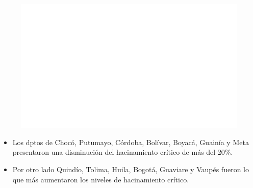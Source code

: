     \begin{figure}[H]
        \caption[Hacinamiento por departamentos - Cambio porcentual entre 2018 y 2020 ]{\label{hacinamiento_dptos_cambio} }
        \begin{center}
        \includegraphics[width=\textwidth,keepaspectratio]{img/var_265_map_change.png}
        \end{center}
    \end{figure}
            \begin{itemize}
                    \item Los dptos de Chocó, Putumayo, Córdoba, Bolívar, Boyacá, Guainía y Meta presentaron una disminución del hacinamiento crítico de más del 20\%.
                    \item Por otro lado Quindío, Tolima, Huila, Bogotá, Guaviare y Vaupés fueron lo que más aumentaron los niveles de hacinamiento crítico.
                    \end{itemize}

